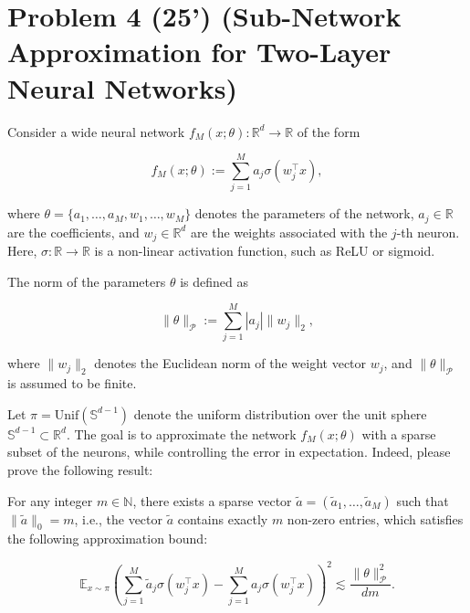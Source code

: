 \section*{Problem 4 (25') (Sub-Network Approximation for Two-Layer Neural Networks)} 


\begin{definition}
    Consider a wide neural network $f_M(x; \theta):\mathbb{R}^{d}\rightarrow\mathbb{R}$ of the form

\[
f_M(x; \theta) := \sum_{j=1}^M a_j \sigma(w_j^{\top} x),
\]

where \( \theta = \{a_1, \dots, a_M, w_1, \dots, w_M\} \) denotes the parameters of the network, \( a_j \in \mathbb{R} \) are the coefficients, and \( w_j \in \mathbb{R}^d \) are the weights associated with the \( j \)-th neuron. Here, \( \sigma:\mathbb{R}\rightarrow\mathbb{R} \) is a non-linear activation function, such as ReLU or sigmoid.
\end{definition}

\begin{definition}
    The norm of the parameters \( \theta \) is defined as

\[
\|\theta\|_{\mathcal{P}} := \sum_{j=1}^M |a_j| \|w_j\|_2,
\]

where \( \|w_j\|_2 \) denotes the Euclidean norm of the weight vector \( w_j \), and \( \|\theta\|_{\mathcal{P}} \) is assumed to be finite.
\end{definition}
 

Let \( \pi = \mathrm{Unif}(\mathbb{S}^{d-1}) \) denote the uniform distribution over the unit sphere \( \mathbb{S}^{d-1} \subset \mathbb{R}^d \). The goal is to approximate the network \( f_M(x; \theta) \) with a sparse subset of the neurons, while controlling the error in expectation. Indeed, please prove the following result:

\begin{theorem}
    For any integer \( m \in \mathbb{N} \), there exists a sparse vector \( \tilde{a} = (\tilde{a}_1, \dots, \tilde{a}_M) \) such that \( \|\tilde{a}\|_0 = m \), i.e., the vector \( \tilde{a} \) contains exactly \( m \) non-zero entries, which satisfies the following approximation bound:

\[
\mathbb{E}_{x \sim \pi} \left( \sum_{j=1}^M \tilde{a}_j \sigma(w_j^{\top} x) - \sum_{j=1}^M a_j \sigma(w_j^{\top} x) \right)^2 \lesssim \frac{\|\theta\|_{\mathcal{P}}^2}{dm}.
\]
\end{theorem}


